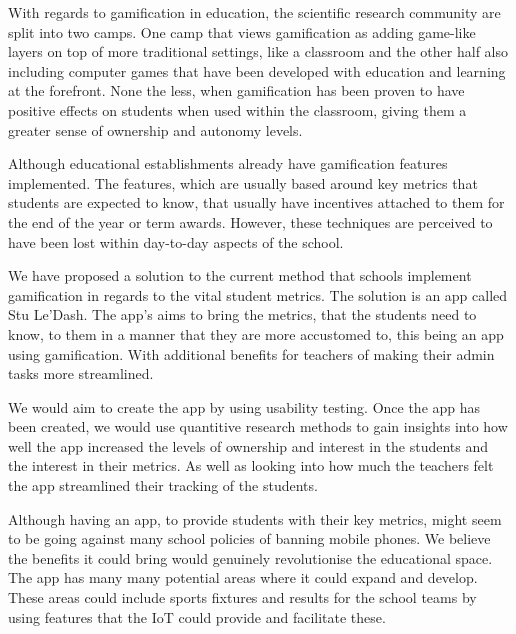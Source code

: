 \documentclass[sigchi]{acmart}
\begin{document}
With regards to gamification in education, the scientific research community are split into two camps.  One camp that views gamification as adding game-like layers on top of more traditional settings, like a classroom and the other half also including computer games that have been developed with education and learning at the forefront. None the less, when gamification has been proven to have positive effects on students when used within the classroom, giving them a greater sense of ownership and autonomy levels.

Although educational establishments already have gamification features implemented. The features, which are usually based around key metrics that students are expected to know, that usually have incentives attached to them for the end of the year or term awards. However, these techniques are perceived to have been lost within day-to-day aspects of the school. 

We have proposed a solution to the current method that schools implement gamification in regards to the vital student metrics. The solution is an app called Stu Le'Dash. The app's aims to bring the metrics, that the students need to know, to them in a manner that they are more accustomed to, this being an app using gamification. With additional benefits for teachers of making their admin tasks more streamlined.

We would aim to create the app by using usability testing. Once the app has been created, we would use quantitive research methods to gain insights into how well the app increased the levels of ownership and interest in the students and the interest in their metrics. As well as looking into how much the teachers felt the app streamlined their tracking of the students.

Although having an app, to provide students with their key metrics, might seem to be going against many school policies of banning mobile phones. We believe the benefits it could bring would genuinely revolutionise the educational space. The app has many many potential areas where it could expand and develop. These areas could include sports fixtures and results for the school teams by using features that the IoT could provide and facilitate these.  
\end{document}
